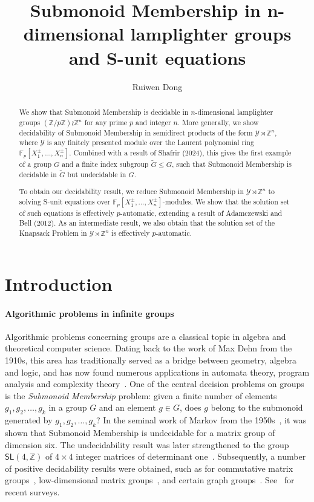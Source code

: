 \documentclass[a4paper,UKenglish,cleveref, autoref, thm-restate]{lipics-v2021}
\title{Submonoid Membership in n-dimensional lamplighter groups and S-unit equations}
\author{Ruiwen Dong}{Department of Mathematics, Saarland University, Germany \and Magdalen College, University of Oxford, United Kingdom}{ruiwen.dong@magd.ox.ac.uk}{https://orcid.org/0009-0007-4349-082X}{}
\newcommand{\Z}{\mathbb{Z}}
\newcommand{\SL}{\mathsf{SL}}
\theoremstyle{definition}
\theoremstyle{definition}
\theoremstyle{definition}
\begin{document}
\maketitle
\begin{abstract}
We show that Submonoid Membership is decidable in $n$-dimensional lamplighter groups $(\mathbb{Z}/p\mathbb{Z}) \wr \mathbb{Z}^n$ for any prime $p$ and integer $n$. 
More generally, we show decidability of Submonoid Membership in semidirect products of the form $\mathcal{Y} \rtimes \mathbb{Z}^n$, where $\mathcal{Y}$ is any finitely presented module over the Laurent polynomial ring $\mathbb{F}_p[X_1^{\pm}, \ldots, X_n^{\pm}]$.
Combined with a result of Shafrir (2024), this gives the first example of a group $G$ and a finite index subgroup $\widetilde{G} \leq G$, such that Submonoid Membership is decidable in $\widetilde{G}$ but undecidable in $G$.

To obtain our decidability result, we reduce Submonoid Membership in $\mathcal{Y} \rtimes \mathbb{Z}^n$ to solving S-unit equations over $\mathbb{F}_p[X_1^{\pm}, \ldots, X_n^{\pm}]$-modules. We show that the solution set of such equations is effectively $p$-automatic, extending a result of Adamczewski and Bell (2012).
As an intermediate result, we also obtain that the solution set of the Knapsack Problem in $\mathcal{Y} \rtimes \mathbb{Z}^n$ is effectively $p$-automatic.
\end{abstract}

\section{Introduction}
\paragraph*{Algorithmic problems in infinite groups}
Algorithmic problems concerning groups are a classical topic in algebra and theoretical computer science.
Dating back to the work of Max Dehn from the 1910s, this area has traditionally served as a bridge between geometry, algebra and logic, and has now found numerous applications in automata theory, program analysis and complexity theory~\cite{beals1993vegas, blondel2005decidable, derksen2005quantum, hrushovski2018polynomial}.
One of the central decision problems on groups is the \emph{Submonoid Membership} problem: given a finite number of elements $g_1, g_2, \ldots, g_{k}$ in a group $G$ and an element $g \in G$, does $g$ belong to the submonoid generated by $g_1, g_2, \ldots, g_{k}$?
In the seminal work of Markov from the 1950s~\cite{markov1951certain}, it was shown that Submonoid Membership is undecidable for a matrix group of dimension six.
The undecidability result was later strengthened to the group $\SL(4, \Z)$ of $4 \times 4$ integer matrices of determinant one~\cite{mikhailova1958occurrence}.
Subsequently, a number of positive decidability results were obtained, such as for commutative matrix groups~\cite{babai1996multiplicative}, low-dimensional matrix groups~\cite{DBLP:conf/icalp/ColcombetOS019, potapov2017decidability}, and certain graph groups~\cite{lohrey2008submonoid}.
See~\cite{dong2023recent, lohrey2024membership} for recent surveys.
\end{document}
